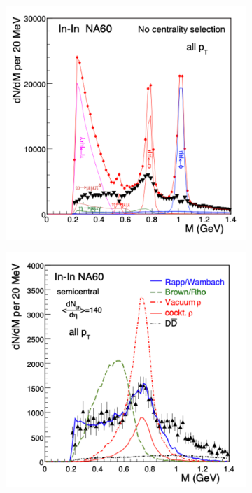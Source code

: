 \begin{figure}[htb]
    \centering
    \begin{subfigure}[b]{0.47\textwidth}
        \centering
        \includegraphics[width=\textwidth,clip]{figures/Chapter1/NA60NoCen.png}
        \caption{}
        \label{fig:NA60NoCen}
    \end{subfigure}
    \hfill
    \begin{subfigure}[b]{0.47\textwidth}
        \centering
        \includegraphics[width=\textwidth,clip]{figures/Chapter1/NA60SemiCentral.png}

\end{subfigure}
\end{figure}
